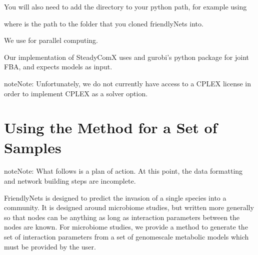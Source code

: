 \documentclass[letterpaper,10pt,english]{sphinxmanual}
\begin{document}
\sphinxAtStartPar
You will also need to add the directory to your python path, for example using

\begin{sphinxVerbatim}[commandchars=\\\{\}]
 
 
\end{sphinxVerbatim}

\sphinxAtStartPar
where  is the path to the folder that you cloned friendlyNets into.

\sphinxAtStartPar
{}

\sphinxAtStartPar
We use  for parallel computing.

\sphinxAtStartPar
Our implementation of SteadyComX uses  and gurobi’s python package for joint FBA, and expects  models as input.

\begin{sphinxadmonition}{note}{Note:}
\sphinxAtStartPar
Unfortunately, we do not currently have access to a CPLEX license in order to implement CPLEX as a solver option.
\end{sphinxadmonition}


\section{Using the Method for a Set of Samples}
\label{\detokenize{usage:using-the-method-for-a-set-of-samples}}
\begin{sphinxadmonition}{note}{Note:}
\sphinxAtStartPar
What follows is a plan of action. At this point, the data formatting and network building steps are incomplete.
\end{sphinxadmonition}

\sphinxAtStartPar
FriendlyNets is designed to predict the invasion of a single species into a community. It is designed around microbiome studies, but written more generally so that nodes can be anything as long as interaction parameters between
the nodes are known. For microbiome studies, we provide a method to generate the set of interaction parameters from a set of genome\sphinxhyphen{}scale metabolic models which must be provided by the user.
\end{document}
